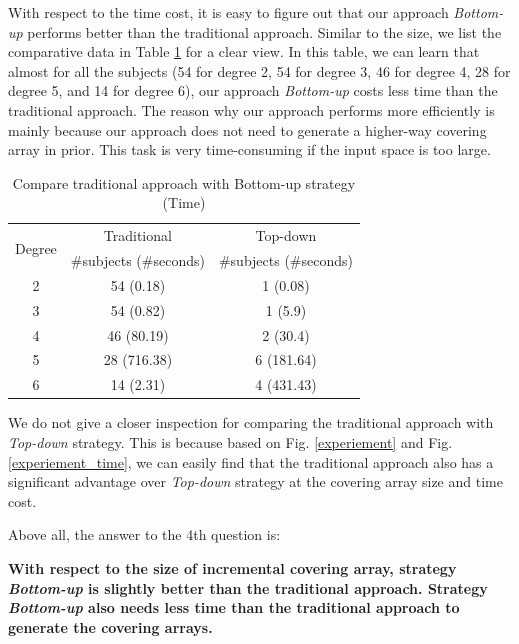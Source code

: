 \documentclass[conference]{IEEEtran}
\theoremstyle{definition}
\begin{document}
With respect to the time cost, it is easy to figure out that our approach \emph{Bottom-up} performs better than the traditional approach. Similar to the size, we list the comparative data in Table \ref{statistic_of_subjects_time_traditional} for a clear view. In this table, we can learn that almost for all the subjects (54 for degree 2, 54 for degree 3, 46 for degree 4, 28 for degree 5, and 14 for degree 6), our approach \emph{Bottom-up} costs less time than the traditional approach.  The reason why our approach performs more efficiently is mainly because our approach does not need to generate a higher-way covering array in prior. This task is very time-consuming if the input space is too large.

\begin{table}[!ht]
\caption{Compare traditional approach with Bottom-up strategy (Time)}
\label{statistic_of_subjects_time_traditional}
\center
    \begin{tabular}{|c|c|c|} \hline
    \multirow{2}{*}{Degree} & Traditional & Top-down \\\cline{2-3}
 & \#subjects (\#seconds) & \#subjects (\#seconds) \\\hline
2 & 54 (0.18) & 1 (0.08) \\
3 & 54 (0.82) & 1 (5.9)  \\
4 & 46 (80.19) & 2 (30.4)  \\
5 & 28 (716.38) & 6 (181.64)  \\
6 & 14 (2.31) & 4 (431.43) \\ \hline
    \end{tabular}%
\end{table}

We do not give a closer inspection for comparing the traditional approach with \emph{Top-down} strategy. This is because based on Fig. \ref{experiement} and Fig. \ref{experiement_time}, we can easily find that the traditional approach also has a significant advantage over \emph{Top-down} strategy at the covering array size and time cost.

Above all, the answer to the 4th question is:

\textbf{With respect to the size of incremental covering array, strategy \emph{Bottom-up} is slightly better than the traditional approach. Strategy \emph{Bottom-up} also needs less time than the traditional approach to generate the covering arrays.}


\end{document}
